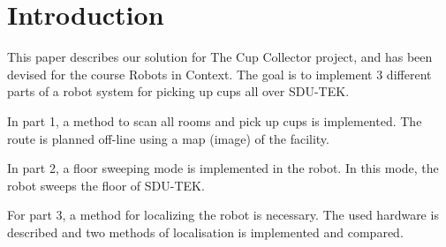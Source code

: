 \section{Introduction}
\label{sec:introduction}
This paper describes our solution for The Cup Collector project, and has been devised for the course Robots in Context. The goal is to implement 3 different parts of a robot system for picking up cups all over SDU-TEK. 

In part 1, a method to scan all rooms and pick up cups is implemented. The route is planned off-line using a map (image) of the facility. 

In part 2, a floor sweeping mode is implemented in the robot. In this mode, the robot sweeps the floor of SDU-TEK.  

For part 3, a method for localizing the robot is necessary. The used hardware is described and two methods of localisation is implemented and compared. 
